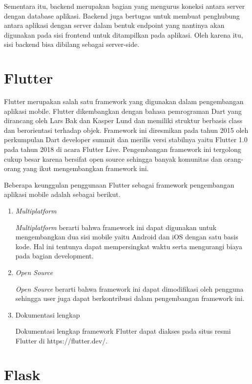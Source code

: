 Sementara itu, backend merupakan bagian yang mengurus koneksi antara server dengan database aplikasi. Backend juga bertugas untuk membuat penghubung antara aplikasi dengan server dalam bentuk endpoint yang nantinya akan digunakan pada sisi frontend untuk ditampilkan pada aplikasi. Oleh karena itu, sisi backend bisa dibilang sebagai server-side.

\section{Flutter}

Flutter merupakan salah satu framework yang digunakan dalam pengembangan aplikasi mobile. Flutter dikembangkan dengan bahasa pemrograman Dart yang dirancang oleh Lars Bak dan Kasper Lund dan memiliki struktur berbasis class dan berorientasi terhadap objek. Framework ini diresmikan pada tahun 2015 oleh perkumpulan Dart developer summit dan merilis versi stabilnya yaitu Flutter 1.0 pada tahun 2018 di acara Flutter Live. Pengembangan framework ini tergolong cukup besar karena bersifat open source sehingga banyak komunitas dan orang-orang yang ikut mengembangkan framework ini.

Beberapa keunggulan penggunaan Flutter sebagai framework pengembangan aplikasi mobile adalah sebagai berikut.

\begin{enumerate}
	\item \textit{Multiplatform}
	
	\textit{Multiplatform} berarti bahwa framework ini dapat digunakan untuk mengembangkan dua sisi mobile yaitu Android dan iOS dengan satu basis kode. Hal ini tentunya dapat mempersingkat waktu serta mengurangi biaya pada bagian development.

	\item \textit{Open Source}
	
	\textit{Open Source} berarti bahwa framework ini dapat dimodifikasi oleh pengguna sehingga user juga dapat berkontribusi dalam pengembangan framework ini.

	\item Dokumentasi lengkap
	
	Dokumentasi lengkap framework Flutter dapat diakses pada situs resmi Flutter di https://flutter.dev/.
\end{enumerate}

\section{Flask}

